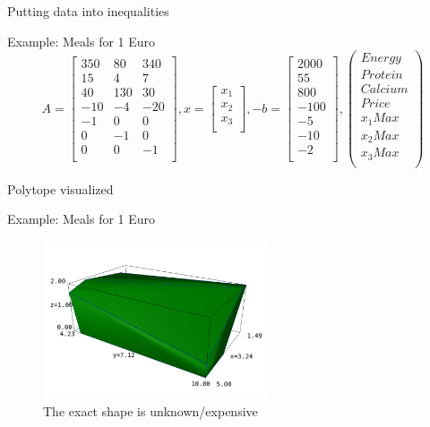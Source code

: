 \documentclass[10pt]{beamer}
\begin{document}
\begin{frame}{Putting data into inequalities}
	\begin{exampleblock}{Example: Meals for 1 Euro}
		\begin{equation*}
			A = \begin{bmatrix}
			350&80&340\\
			15&4&7\\
			40&130&30\\
			-10&-4&-20\\
			-1&0&0\\
			0&-1&0\\
			0&0&-1\\
			\end{bmatrix},
			x = \begin{bmatrix}
			x_1\\x_2\\x_3\\
			\end{bmatrix},
			-b = \begin{bmatrix}
			2000\\
			55\\
			800\\
			-100\\
			-5\\
			-10\\
			-2\\
			\end{bmatrix},
			\begin{pmatrix}
			Energy\\
			Protein\\
			Calcium\\
			Price\\
			x_1Max\\
			x_2Max\\
			x_3Max\\
			\end{pmatrix}
		\end{equation*}
	\end{exampleblock}
\end{frame}

\begin{frame}{Polytope visualized}
	\begin{exampleblock}{Example: Meals for 1 Euro}
		\begin{figure}[ht]
			\includegraphics[width = 0.6\textwidth]{allMeals2.png}
			\caption{The exact shape is unknown/expensive}
		\end{figure}
	\end{exampleblock}
\end{frame}
\end{document}

